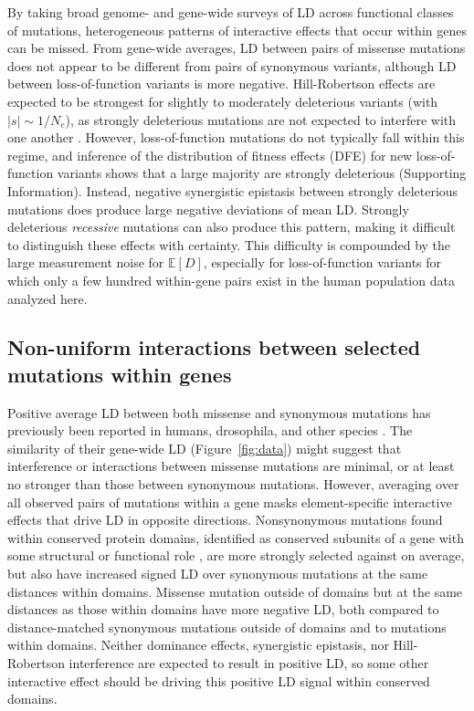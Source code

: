 \documentclass[]{article}
\newcommand{\E}{\mathbb{E}}
\begin{document}
By taking broad genome- and gene-wide surveys of LD across functional classes
of mutations, heterogeneous patterns of interactive effects that occur within
genes can be missed. From gene-wide averages, LD between pairs of missense
mutations does not appear to be different from pairs of synonymous variants,
although LD between loss-of-function variants is more negative. Hill-Robertson
effects are expected to be strongest for slightly to moderately deleterious
variants (with \(|s|\sim 1/N_e\)), as strongly deleterious mutations are not
expected to interfere with one another \citep{McVean2000-ox}. However,
loss-of-function mutations do not typically fall within this regime, and
inference of the distribution of fitness effects (DFE) for new loss-of-function
variants shows that a large majority are strongly deleterious (Supporting
Information). Instead, negative synergistic epistasis between strongly
deleterious mutations does produce large negative deviations of mean LD.
Strongly deleterious \emph{recessive} mutations can also produce this pattern,
making it difficult to distinguish these effects with certainty. This
difficulty is compounded by the large measurement noise for \(\E[D]\),
especially for loss-of-function variants for which only a few hundred
within-gene pairs exist in the human population data analyzed here.

\subsection{Non-uniform interactions between selected mutations within genes}

Positive average LD between both missense and synonymous mutations has
previously been reported in humans, drosophila, and other species
\citep{Sohail2017-zq,Garcia2021-zn,Sandler2021-of}. The similarity of their
gene-wide LD (Figure~\ref{fig:data}) might suggest that interference or
interactions between missense mutations are minimal, or at least no stronger
than those between synonymous mutations. However, averaging over all observed
pairs of mutations within a gene masks element-specific interactive effects
that drive LD in opposite directions. Nonsynonymous mutations found within
conserved protein domains, identified as conserved subunits of a gene with some
structural or functional role \citep{Stanek2020-pa}, are more strongly selected
against on average, but also have increased signed LD over synonymous mutations
at the same distances within domains. Missense mutation outside of domains but
at the same distances as those within domains have more negative LD, both
compared to distance-matched synonymous mutations outside of domains and to
mutations within domains. Neither dominance effects, synergistic epistasis, nor
Hill-Robertson interference are expected to result in positive LD, so some
other interactive effect should be driving this positive LD signal within
conserved domains.
\end{document}
